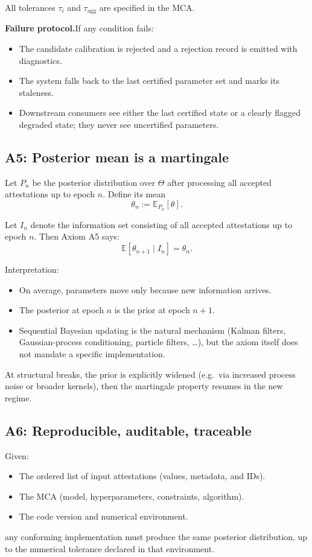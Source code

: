 \documentclass[11pt,a4paper]{article}
\begin{document}
All tolerances $\tau_i$ and $\tau_{\text{agg}}$ are specified in the MCA.

\textbf{Failure protocol.}\quad If any condition fails:
\begin{itemize}
    \item The candidate calibration is rejected and a rejection record is emitted with diagnostics.
    \item The system falls back to the last certified parameter set and marks its staleness.
    \item Downstream consumers see either the last certified state or a clearly flagged degraded state; they never see uncertified parameters.
\end{itemize}

\subsection{A5: Posterior mean is a martingale}

Let $P_n$ be the posterior distribution over $\Theta$ after processing all accepted attestations up to epoch $n$. Define its mean
\[
    \theta_n := \mathbb{E}_{P_n}[\theta].
\]

Let $I_n$ denote the information set consisting of all accepted attestations up to epoch $n$. Then Axiom A5 says:
\[
    \mathbb{E}[\theta_{n+1} \mid I_n] = \theta_n.
\]

Interpretation:
\begin{itemize}
    \item On average, parameters move only because new information arrives.
    \item The posterior at epoch $n$ is the prior at epoch $n+1$.
    \item Sequential Bayesian updating is the natural mechanism (Kalman filters, Gaussian-process conditioning, particle filters, \ldots), but the axiom itself does not mandate a specific implementation.
\end{itemize}

At structural breaks, the prior is explicitly widened (e.g.\ via increased process noise or broader kernels), then the martingale property resumes in the new regime.

\subsection{A6: Reproducible, auditable, traceable}

Given:
\begin{itemize}
    \item The ordered list of input attestations (values, metadata, and IDs).
    \item The MCA (model, hyperparameters, constraints, algorithm).
    \item The code version and numerical environment.
\end{itemize}
any conforming implementation must produce the same posterior distribution, up to the numerical tolerance declared in that environment.
\end{document}
